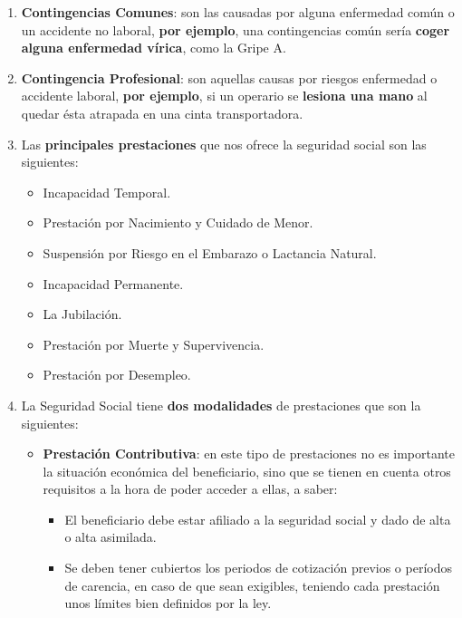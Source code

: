 \begin{enumerate}[label=\alph*)]
    \item \textbf{Contingencias Comunes}: son las causadas por alguna enfermedad común o un accidente no laboral,  \textbf{por ejemplo}, una contingencias común sería \textbf{coger alguna enfermedad vírica}, como la Gripe A.

    \item \textbf{Contingencia Profesional}: son aquellas causas por riesgos enfermedad o accidente laboral, \textbf{por ejemplo}, si un operario se \textbf{lesiona una mano} al quedar ésta atrapada en una cinta transportadora.

    \item Las \textbf{principales prestaciones} que nos ofrece la seguridad social son las siguientes:
    \begin{itemize}
        \item Incapacidad Temporal.
        \item Prestación por Nacimiento y Cuidado de Menor.
        \item Suspensión por Riesgo en el Embarazo o Lactancia Natural.
        \item Incapacidad Permanente.
        \item La Jubilación.
        \item Prestación por Muerte y Supervivencia.
        \item Prestación por Desempleo.
    \end{itemize}

    \item La Seguridad Social tiene \textbf{dos modalidades} de prestaciones que son la siguientes:

    \begin{itemize}
        \item \textbf{Prestación Contributiva}: en este tipo de prestaciones no es importante la situación económica del beneficiario, sino que se tienen en cuenta otros requisitos a la hora de poder acceder a ellas, a saber:

        \begin{itemize}
            \item El beneficiario debe estar afiliado a la seguridad social y dado de alta o alta asimilada.
            \item Se deben tener cubiertos los periodos de cotización previos o períodos de carencia, en caso de que sean exigibles, teniendo cada prestación unos límites bien definidos por la ley.
        \end{itemize}


\end{itemize}
\end{enumerate}
